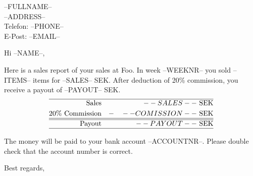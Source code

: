 \documentclass[a4paper,version=last,fromalign=left]{scrlttr2}
\begin{document}
 
\begin{letter}{--FULLNAME--\\--ADDRESS--\\Telefon: --PHONE--\\E-Post: --EMAIL--\\}


\opening{Hi --NAME--,}

Here is a sales report of your sales at Foo. 
\noindent In week --WEEKNR-- you sold --ITEMS-- items for --SALES-- SEK. After deduction of 20\% commission, you receive a payout of --PAYOUT-- SEK. \\

\begin{align*}
  \hline
  \text{Sales} &  & --SALES--      & \text{ SEK} \\
  \text{20\% Commission}   &  & - \quad--COMISSION--  & \text{ SEK} \\
  \hline
  \hline
\text{Payout} &   & --PAYOUT-- & \text{ SEK} \\
  \hline
\end{align*}

\noindent The money will be paid to your bank account --ACCOUNTNR--. Please double check that the account number is correct. 

\closing{Best regards,}
 
\end{letter}
 
\end{document}
